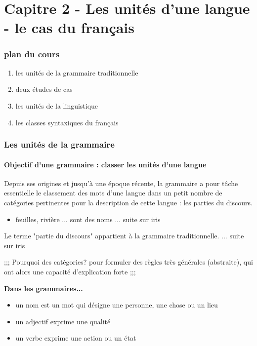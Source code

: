 \part{Capitre 2 - Les unités d'une langue - le cas du français}

\section*{plan du cours}
\begin{enumerate}
   \item les unités de la grammaire traditionnelle
   \item deux études de cas
   \item les unités de la linguistique
   \item les classes syntaxiques du français
\end{enumerate}

\section{Les unités de la grammaire}
\subsection{Objectif d'une grammaire : classer les unités d'une langue}

Depuis ses origines et jusqu'à une époque récente, la grammaire a pour tâche essentielle le classement des mots d'une langue dans un petit nombre de catégories pertinentes pour la description de cette langue : les parties du discours.
\begin{itemize}
   \item feuilles, rivière ... sont des noms
   ... suite sur iris
\end{itemize}

Le terme "partie du discours" appartient à la grammaire traditionnelle. ... suite sur iris

;;;
Pourquoi des catégories? 
   pour formuler des règles très générales (abstraite), qui ont alors une capacité d'explication forte
;;;

\textbf{Dans les grammaires...}
\begin{itemize}
   \item un nom est un mot qui désigne une personne, une chose ou un lieu
   \item un adjectif exprime une qualité 
   \item un verbe exprime une action ou un état
\end{itemize}

